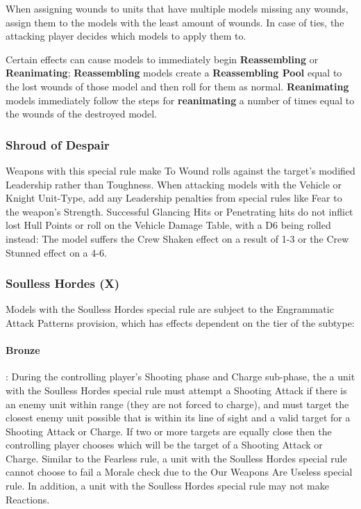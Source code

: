 \begin{multicols}{2}
When assigning wounds to units that have multiple models missing any wounds, assign them to the models with the least amount of wounds. In case of ties, the attacking player decides which models to apply them to.

Certain effects can cause models to immediately begin \textbf{Reassembling} or \textbf{Reanimating}; \textbf{Reassembling} models create a \textbf{Reassembling Pool} equal to the lost wounds of those model and then roll for them as normal. \textbf{Reanimating} models immediately follow the steps for \textbf{reanimating} a number of times equal to the wounds of the destroyed model.

\subsubsection{Shroud of Despair} \label{Shroud of Despair}

Weapons with this special rule make To Wound rolls against the target's modified Leadership rather than Toughness. When attacking models with the Vehicle or Knight Unit-Type, add any Leadership penalties from special rules like Fear to the weapon's Strength. Successful Glancing Hits or Penetrating hits do not inflict lost Hull Points or roll on the Vehicle Damage Table, with a D6 being rolled instead: The model suffers the Crew Shaken effect on a result of 1-3 or the Crew Stunned effect on a 4-6.

\subsubsection{Soulless Hordes (X)} \label{Soulless Hordes}

Models with the Soulless Hordes special rule are subject to the Engrammatic Attack Patterns provision, which has effects dependent on the tier of the subtype:

\paragraph{Bronze}: During the controlling player's Shooting phase and Charge sub-phase, the a unit with the Soulless Hordes special rule must attempt a Shooting Attack if there is an enemy unit within range (they are not forced to charge), and must target the closest enemy unit possible that is within its line of sight and a valid target for a Shooting Attack or Charge. If two or more targets are equally close then the controlling player chooses which will be the target of a Shooting Attack or Charge. Similar to the Fearless rule, a unit with the Soulless Hordes special rule cannot choose to fail a Morale check due to the Our Weapons Are Useless special rule. In addition, a unit with the Soulless Hordes special rule may not make Reactions.


\end{multicols}
